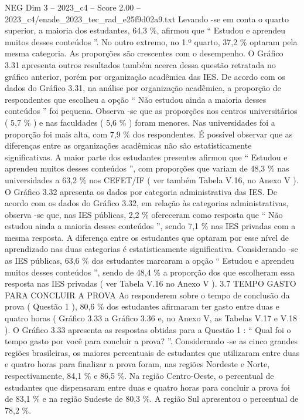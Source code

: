 \begin{textsample}{NEG Dim 3 – 2023\_c4 – Score 2.00 – 2023\_c4/enade\_2023\_tec\_rad\_e25f9d02a9.txt}
Levando -se em conta o quarto superior, a maioria dos estudantes, 64,3 \%, afirmou que “ Estudou e aprendeu muitos desses conteúdos ”.
No outro extremo, no 1.º quarto, 37,2 \% optaram pela mesma categoria.
As proporções são crescentes com o desempenho.
O Gráfico 3.31 apresenta outros resultados também acerca dessa questão retratada no gráfico anterior, porém por organização acadêmica das IES.
De acordo com os dados do Gráfico 3.31, na análise por organização acadêmica, a proporção de respondentes que escolheu a opção “ Não estudou ainda a maioria desses conteúdos ” foi pequena.
Observa -se que as proporções nos centros universitários ( 5,7 \% ) e nas faculdades ( 5,6 \% ) foram menores.
Nas universidades foi a proporção foi mais alta, com 7,9 \% dos respondentes.
É possível observar que as diferenças entre as organizações acadêmicas não são estatisticamente significativas.
A maior parte dos estudantes presentes afirmou que “ Estudou e aprendeu muitos desses conteúdos ”, com proporções que variam de 48,3 \% nas universidades a 63,2 \% nos CEFET/IF ( ver também Tabela V.16, no Anexo V ).
O Gráfico 3.32 apresenta os dados por categoria administrativa das IES.
De acordo com os dados do Gráfico 3.32, em relação às categorias administrativas, observa -se que, nas IES públicas, 2,2 \% ofereceram como resposta que “ Não estudou ainda a maioria desses conteúdos ”, sendo 7,1 \% nas IES privadas com a mesma resposta.
A diferença entre os estudantes que optaram por esse nível de aprendizado nas duas categorias é estatisticamente significativa.
Considerando -se as IES públicas, 63,6 \% dos estudantes marcaram a opção “ Estudou e aprendeu muitos desses conteúdos ”, sendo de 48,4 \% a proporção dos que escolheram essa resposta nas IES privadas ( ver Tabela V.16 no Anexo V ). 3.7 TEMPO GASTO PARA CONCLUIR A PROVA Ao responderem sobre o tempo de conclusão da prova ( Questão 1 ), 80,6 \% dos estudantes afirmaram ter gasto entre duas e quatro horas ( Gráfico 3.33 a Gráfico 3.36 e, no Anexo V, as Tabelas V.17 e V.18 ).
O Gráfico 3.33 apresenta as respostas obtidas para a Questão 1 : “ Qual foi o tempo gasto por você para concluir a prova? ”.
Considerando -se as cinco grandes regiões brasileiras, os maiores percentuais de estudantes que utilizaram entre duas e quatro horas para finalizar a prova foram, nas regiões Nordeste e Norte, respectivamente, 84,1 \% e 86,5 \%.
Na região Centro-Oeste, o percentual de estudantes que dispensaram entre duas e quatro horas para concluir a prova foi de 83,1 \% e na região Sudeste de 80,3 \%.
A região Sul apresentou o percentual de 78,2 \%.

\end{textsample}
